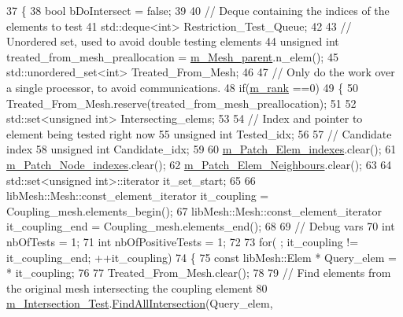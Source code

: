 \begin{DoxyCode}
37 \{
38     \textcolor{keywordtype}{bool} bDoIntersect = \textcolor{keyword}{false};
39 
40     \textcolor{comment}{// Deque containing the indices of the elements to test}
41     std::deque<int> Restriction\_Test\_Queue;
42 
43     \textcolor{comment}{// Unordered set, used to avoid double testing elements}
44     \textcolor{keywordtype}{unsigned} \textcolor{keywordtype}{int} treated\_from\_mesh\_preallocation = \hyperlink{classcarl_1_1_patch__construction_aec2f60b62d5d7b44bfcc4f9ca9de28d2}{m\_Mesh\_parent}.n\_elem();
45     std::unordered\_set<int> Treated\_From\_Mesh;
46 
47     \textcolor{comment}{// Only do the work over a single processor, to avoid communications.}
48     \textcolor{keywordflow}{if}(\hyperlink{classcarl_1_1_patch__construction_abb348e12e9fb16cb426e68127ec02c95}{m\_rank} ==0)
49     \{
50         Treated\_From\_Mesh.reserve(treated\_from\_mesh\_preallocation);
51 
52         std::set<unsigned int> Intersecting\_elems;
53 
54         \textcolor{comment}{// Index and pointer to element being tested right now}
55         \textcolor{keywordtype}{unsigned} \textcolor{keywordtype}{int}    Tested\_idx;
56 
57         \textcolor{comment}{// Candidate index}
58         \textcolor{keywordtype}{unsigned} \textcolor{keywordtype}{int}    Candidate\_idx;
59 
60         \hyperlink{classcarl_1_1_patch__construction_af7db498027d46bff8464757e824404fb}{m\_Patch\_Elem\_indexes}.clear();
61         \hyperlink{classcarl_1_1_patch__construction_a85fb959e6f57d935a8d6fe0d4f0f7f46}{m\_Patch\_Node\_indexes}.clear();
62         \hyperlink{classcarl_1_1_patch__construction_a47c4343835537781c48813feed01e60e}{m\_Patch\_Elem\_Neighbours}.clear();
63 
64         std::set<unsigned int>::iterator it\_set\_start;
65 
66         libMesh::Mesh::const\_element\_iterator it\_coupling = Coupling\_mesh.elements\_begin();
67         libMesh::Mesh::const\_element\_iterator it\_coupling\_end = Coupling\_mesh.elements\_end();
68 
69         \textcolor{comment}{// Debug vars}
70         \textcolor{keywordtype}{int} nbOfTests = 1;
71         \textcolor{keywordtype}{int} nbOfPositiveTests = 1;
72 
73         \textcolor{keywordflow}{for}( ; it\_coupling != it\_coupling\_end; ++it\_coupling)
74         \{
75             \textcolor{keyword}{const} libMesh::Elem * Query\_elem = * it\_coupling;
76 
77             Treated\_From\_Mesh.clear();
78 
79             \textcolor{comment}{// Find elements from the original mesh intersecting the coupling element}
80             \hyperlink{classcarl_1_1_patch__construction_a59f947d3d18761b1ad1a5913eb59ca83}{m\_Intersection\_Test}.\hyperlink{classcarl_1_1_intersection___tools_a8238069bd83ef1029c6a5b60a188763b}{FindAllIntersection}(Query\_elem,

\end{DoxyCode}
